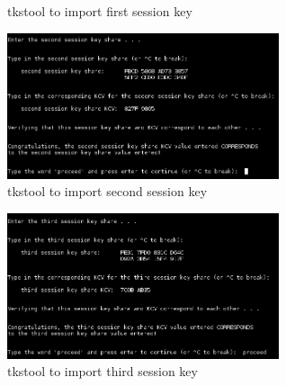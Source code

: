 \documentclass[a4paper]{article}
\begin{document}
\begin{itemize}
\begin{itemize}
\begin{itemize}
\begin{figure}[H]
                                    \caption{tkstool to import first session key}
                                \end{figure}
                                \begin{figure}[H]
                                    \centering
                                    \includegraphics[width=80mm]{tkstool-import-sharedSecret4.png}
                                    \caption{tkstool to import second session key}
                                \end{figure}
                                \begin{figure}[H]
                                    \centering
                                    \includegraphics[width=80mm]{tkstool-import-sharedSecret5.png}
                                    \caption{tkstool to import third session key}
                                \end{figure}
                        \end{itemize}
                \end{itemize}
    \end{itemize}
\end{document}
